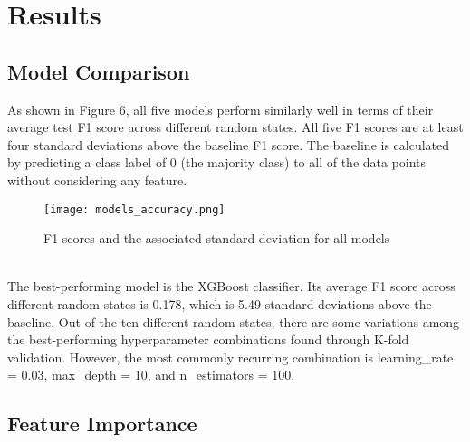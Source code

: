 \documentclass[12pt]{article}
\begin{document}
\section{Results}
\subsection{Model Comparison}
As shown in Figure 6, all five models perform similarly well in terms of their average test F1 score across different random states. All five F1 scores are at least four standard deviations above the baseline F1 score. The baseline is calculated by predicting a class label of 0 (the majority class)  to all of the data points without considering any feature.\\
\begin{figure}[!h]
\centering
\texttt{[image: models\_accuracy.png]}
\caption{F1 scores and the associated standard deviation for all models}
\end{figure}
\\
The best-performing model is the XGBoost classifier. Its average F1 score across different random states is 0.178, which is 5.49 standard deviations above the baseline. Out of the ten different random states, there are some variations among the best-performing hyperparameter combinations found through K-fold validation. However, the most commonly recurring combination is learning\_rate = 0.03, max\_depth = 10, and n\_estimators = 100. 
\subsection{Feature Importance}
\end{document}
